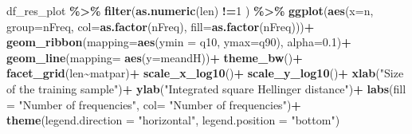 \documentclass[
]{article}
\newenvironment{Shaded}{\begin{snugshade}}{\end{snugshade}}
\newcommand{\AttributeTok}[1]{\textcolor[rgb]{0.13,0.29,0.53}{#1}}
\newcommand{\DecValTok}[1]{\textcolor[rgb]{0.00,0.00,0.81}{#1}}
\newcommand{\FloatTok}[1]{\textcolor[rgb]{0.00,0.00,0.81}{#1}}
\newcommand{\FunctionTok}[1]{\textcolor[rgb]{0.13,0.29,0.53}{\textbf{#1}}}
\newcommand{\NormalTok}[1]{#1}
\newcommand{\SpecialCharTok}[1]{\textcolor[rgb]{0.81,0.36,0.00}{\textbf{#1}}}
\newcommand{\StringTok}[1]{\textcolor[rgb]{0.31,0.60,0.02}{#1}}
\begin{document}
\begin{Shaded}
\begin{Highlighting}[]

\NormalTok{df\_res\_plot }\SpecialCharTok{\%\textgreater{}\%}
  \FunctionTok{filter}\NormalTok{(}\FunctionTok{as.numeric}\NormalTok{(len) }\SpecialCharTok{!=}\DecValTok{1}\NormalTok{ ) }\SpecialCharTok{\%\textgreater{}\%}
  \FunctionTok{ggplot}\NormalTok{(}\FunctionTok{aes}\NormalTok{(}\AttributeTok{x=}\NormalTok{n, }\AttributeTok{group=}\NormalTok{nFreq, }
             \AttributeTok{col=}\FunctionTok{as.factor}\NormalTok{(nFreq), }\AttributeTok{fill=}\FunctionTok{as.factor}\NormalTok{(nFreq)))}\SpecialCharTok{+}
  \FunctionTok{geom\_ribbon}\NormalTok{(}\AttributeTok{mapping=}\FunctionTok{aes}\NormalTok{(}\AttributeTok{ymin =}\NormalTok{ q10, }\AttributeTok{ymax=}\NormalTok{q90), }\AttributeTok{alpha=}\FloatTok{0.1}\NormalTok{)}\SpecialCharTok{+}
  \FunctionTok{geom\_line}\NormalTok{(}\AttributeTok{mapping=} \FunctionTok{aes}\NormalTok{(}\AttributeTok{y=}\NormalTok{meandH))}\SpecialCharTok{+}
  \FunctionTok{theme\_bw}\NormalTok{()}\SpecialCharTok{+}
  \FunctionTok{facet\_grid}\NormalTok{(len}\SpecialCharTok{\textasciitilde{}}\NormalTok{matpar)}\SpecialCharTok{+}
  \FunctionTok{scale\_x\_log10}\NormalTok{()}\SpecialCharTok{+}
  \FunctionTok{scale\_y\_log10}\NormalTok{()}\SpecialCharTok{+}
  \FunctionTok{xlab}\NormalTok{(}\StringTok{"Size of the training sample"}\NormalTok{)}\SpecialCharTok{+}
  \FunctionTok{ylab}\NormalTok{(}\StringTok{"Integrated square Hellinger distance"}\NormalTok{)}\SpecialCharTok{+}
  \FunctionTok{labs}\NormalTok{(}\AttributeTok{fill =} \StringTok{"Number of frequencies"}\NormalTok{,}
       \AttributeTok{col=} \StringTok{"Number of frequencies"}\NormalTok{)}\SpecialCharTok{+}
  \FunctionTok{theme}\NormalTok{(}\AttributeTok{legend.direction =} \StringTok{"horizontal"}\NormalTok{, }\AttributeTok{legend.position =} \StringTok{"bottom"}\NormalTok{)}
\end{Highlighting}
\end{Shaded}
\end{document}

